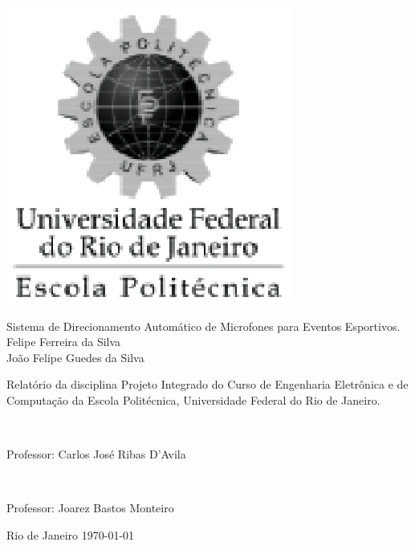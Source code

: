 \includegraphics[scale=0.7]{./FIGURAS/Poli.eps}

\begin{center}
\large{Sistema de Direcionamento Autom\'{a}tico de Microfones para Eventos Esportivos.\\}
\vspace{2cm}
\large{Felipe Ferreira da Silva\\}
\large{Jo\~{a}o Felipe Guedes da Silva\\}
\end{center}

\vspace{3cm}\hspace{7cm}
\hfill
\parbox{8cm}{Relat\'{o}rio da disciplina Projeto Integrado do Curso de Engenharia Eletr\^{o}nica e de Computa\c{c}\~{a}o da Escola Polit\'{e}cnica, Universidade Federal do Rio de Janeiro.}\\
\parbox{8cm}{Professor: Carlos Jos\'{e} Ribas D'Avila}\\
\hfill
\parbox{8.0cm}{Professor: Joarez Bastos Monteiro\\}
\vspace{2cm}

\begin{center}
Rio de Janeiro
\today
\end{center}





